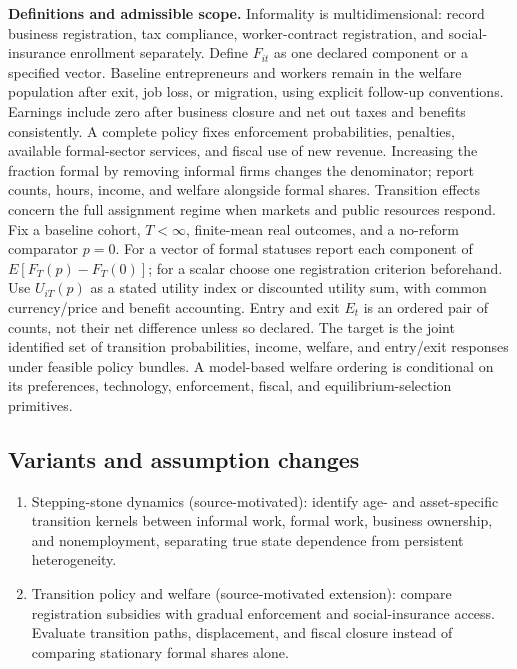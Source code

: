 \documentclass[11pt,a4paper]{article}
\begin{document}
\textbf{Definitions and admissible scope.} Informality is multidimensional: record business registration, tax compliance, worker-contract registration, and social-insurance enrollment separately. Define \(F_{it}\) as one declared component or a specified vector. Baseline entrepreneurs and workers remain in the welfare population after exit, job loss, or migration, using explicit follow-up conventions. Earnings include zero after business closure and net out taxes and benefits consistently. A complete policy fixes enforcement probabilities, penalties, available formal-sector services, and fiscal use of new revenue. Increasing the fraction formal by removing informal firms changes the denominator; report counts, hours, income, and welfare alongside formal shares. Transition effects concern the full assignment regime when markets and public resources respond. Fix a baseline cohort, \(T<\infty\), finite-mean real outcomes, and a no-reform comparator \(p=0\). For a vector of formal statuses report each component of \(E[F_T(p)-F_T(0)]\); for a scalar choose one registration criterion beforehand. Use \(U_{iT}(p)\) as a stated utility index or discounted utility sum, with common currency/price and benefit accounting. Entry and exit \(E_t\) is an ordered pair of counts, not their net difference unless so declared. The target is the joint identified set of transition probabilities, income, welfare, and entry/exit responses under feasible policy bundles. A model-based welfare ordering is conditional on its preferences, technology, enforcement, fiscal, and equilibrium-selection primitives.
\subsection*{Variants and assumption changes}
\begin{enumerate}
\item Stepping-stone dynamics (source-motivated): identify age- and asset-specific transition kernels between informal work, formal work, business ownership, and nonemployment, separating true state dependence from persistent heterogeneity.
\item Transition policy and welfare (source-motivated extension): compare registration subsidies with gradual enforcement and social-insurance access. Evaluate transition paths, displacement, and fiscal closure instead of comparing stationary formal shares alone.
\end{enumerate}
\end{document}
